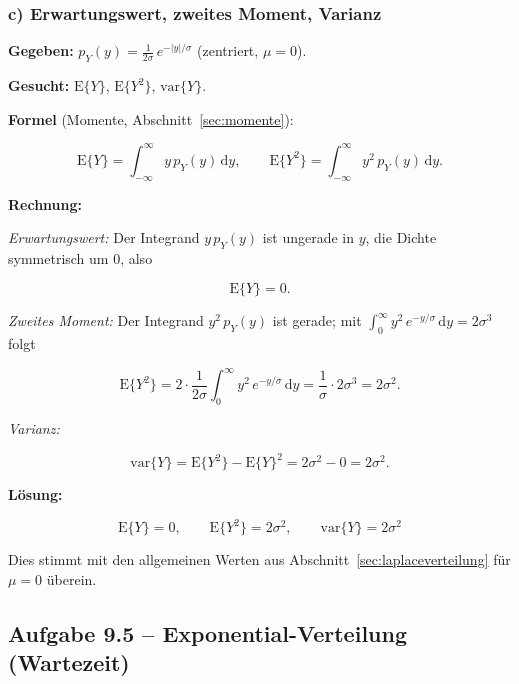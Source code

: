 \subsubsection*{c) Erwartungswert, zweites Moment, Varianz}

\begin{beispiel}

\textbf{Gegeben:} $p_Y(y) = \tfrac{1}{2\sigma}\, e^{-|y|/\sigma}$ (zentriert,
$\mu = 0$).

\textbf{Gesucht:} $\mathrm{E}\{Y\}$, $\mathrm{E}\{Y^2\}$, $\mathrm{var}\{Y\}$.

\textbf{Formel} (Momente, Abschnitt~\ref{sec:momente}):

$$
\mathrm{E}\{Y\} = \int_{-\infty}^{\infty} y\, p_Y(y)\,\mathrm{d}y, \qquad
\mathrm{E}\{Y^2\} = \int_{-\infty}^{\infty} y^2\, p_Y(y)\,\mathrm{d}y.
$$

\textbf{Rechnung:}

\emph{Erwartungswert:} Der Integrand $y\, p_Y(y)$ ist ungerade in $y$, die
Dichte symmetrisch um $0$, also

$$
\mathrm{E}\{Y\} = 0.
$$

\emph{Zweites Moment:} Der Integrand $y^2\, p_Y(y)$ ist gerade; mit
$\int_0^{\infty} y^2\, e^{-y/\sigma}\,\mathrm{d}y = 2\sigma^3$ folgt

$$
\mathrm{E}\{Y^2\} = 2 \cdot \frac{1}{2\sigma} \int_0^{\infty} y^2\, e^{-y/\sigma}\,\mathrm{d}y
= \frac{1}{\sigma} \cdot 2\sigma^3 = 2\sigma^2.
$$

\emph{Varianz:}

$$
\mathrm{var}\{Y\} = \mathrm{E}\{Y^2\} - \mathrm{E}\{Y\}^2 = 2\sigma^2 - 0 = 2\sigma^2.
$$

\textbf{Lösung:}

$$
\boxed{\;\mathrm{E}\{Y\} = 0, \qquad \mathrm{E}\{Y^2\} = 2\sigma^2, \qquad
\mathrm{var}\{Y\} = 2\sigma^2\;}
$$

Dies stimmt mit den allgemeinen Werten aus Abschnitt~\ref{sec:laplaceverteilung}
für $\mu = 0$ überein.

\end{beispiel}

\subsection*{Aufgabe 9.5 – Exponential-Verteilung (Wartezeit)}

